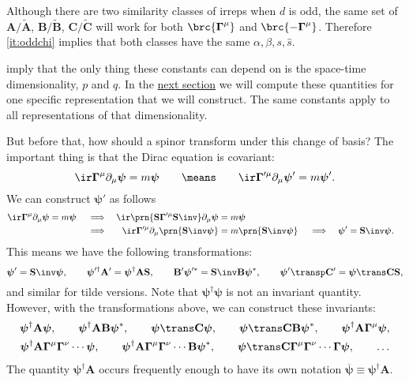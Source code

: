 \documentclass[11pt]{article}
\newcommand{\Gammab}{\boldsymbol{\Gamma}}
\renewcommand{\S}{\mathbf{S}}
\newcommand{\A}{\mathbf{A}}
\newcommand{\B}{\mathbf{B}}
\renewcommand{\C}{\mathbf{C}}
\newcommand{\At}{\widetilde{\mathbf{A}}}
\newcommand{\Bt}{\widetilde{\mathbf{B}}}
\newcommand{\Ct}{\widetilde{\mathbf{C}}}
\newcommand{\psib}{\boldsymbol{\psi}}
\begin{document}
Although there are two similarity classes of irreps when $d$ is odd, the same set of $\A/\At$, $\B/\Bt$, $\C/\Ct$ will work for both $\brc{\Gammab^\mu}$ and $\brc{ -\Gammab^\mu }$.
Therefore \cref{it:oddchi} implies that both classes have the same $\alpha, \beta, s, \hat{s}$.

 imply that the only thing these constants can depend on is the space-time dimensionality, $p$ and $q$.
In the \hyperref[sec:explicit]{next section} we will compute these quantities for one specific representation that we will construct.
The same constants apply to all representations of that dimensionality.

But before that, how should a spinor transform under this change of basis?
The important thing is that the Dirac equation is covariant:
%
\begin{equation*}
  \ir \Gammab^\mu \partial_\mu \psib = m \psib
  \qquad \means \qquad
  \ir \Gammab'^\mu \partial_\mu \psib' = m \psib'.  
\end{equation*}
%
We can construct $\psib'$ as follows
%
\begin{equation*}
\begin{aligned}
  \ir \Gammab^\mu \partial_\mu \psib &= m \psib &
  &\implies &
  \ir \prn{\S \Gammab'^\mu \S\inv} \partial_\mu \psib &= m \psib \\ &&
  &\implies &
  \ir \Gammab'^\mu \partial_\mu \prn{\S\inv\psib} &= m \prn{\S\inv\psib} &
  &\implies &
  \psib' &= \S\inv \psib.
\end{aligned}
\end{equation*}
%
This means we have the following transformations:
%
\begin{equation}\label{eq:spinorbasis}
  \psib' = \S\inv \psib, \qquad
  \psib'^\dag \A' = \psib^\dag \A \S, \qquad
  \B' \psib'^\ast = \S\inv \B \psib^\ast, \qquad
  \psib'\transp \C' = \psib\trans \C \S,
\end{equation}
%
and similar for tilde versions.
Note that $\psib^\dag \psib$ is not an invariant quantity.
However, with the transformations above, we can construct these invariants:
%
\begin{equation}\label{eq:spinorinvt}
\begin{gathered}
  \psib^\dag \A \psib, \qquad
  \psib^\dag \A \B \psib^\ast, \qquad
  \psib\trans \C \psib, \qquad
  \psib\trans \C \B \psib^\ast, \qquad
  \psib^\dag \A \Gammab^\mu \psib, \\
  \psib^\dag \A \Gammab^\mu \Gammab^\nu \cdots \psib, \qquad
  \psib^\dag \A \Gammab^\mu \Gammab^\nu \cdots \B \psib^\ast, \qquad
  \psib\trans \C \Gammab^\mu \Gammab^\nu \cdots \Gammab \psib, \qquad
  \ldots
\end{gathered}
\end{equation}
%
The quantity \( \psib^\dag \A \) occurs frequently enough to have its own notation \( \overline{\psib} \equiv \psib^\dag \A \).
\end{document}
